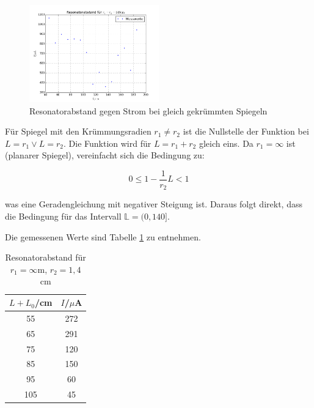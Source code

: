 \begin{figure}
	\centering
	\includegraphics[width=0.5\textwidth]{plots/stabil1}
	\caption{Resonatorabstand gegen Strom bei gleich gekrümmten Spiegeln}
	\label{fig:stabil1}
\end{figure}

\noindent Für Spiegel mit den Krümmungsradien \(r_1\neq r_2\) ist die Nullstelle der Funktion bei \(L=r_1\lor L=r_2\). Die Funktion wird für \(L=r_1+r_2\) gleich eins. Da \(r_1=\infty\) ist (planarer Spiegel), vereinfacht sich die Bedingung zu:

\begin{equation}
0\le1-\frac{1}{r_2}L<1
\end{equation}

\noindent was eine Geradengleichung mit negativer Steigung ist. Daraus folgt direkt, dass die Bedingung für das Intervall \(\mathbb{L}=(0,140]\).

\noindent Die gemessenen Werte sind Tabelle \ref{tab:t2} zu entnehmen.

\begin{table}[H]
	\begin{center}
		\begin{tabular}{c c}
			\toprule
			\(L+L_0\)/cm & \(I\)/\(\mu\)A \\
			\midrule
			55              &272          \\                                                                           
			65              &291        \\                                                                             
			75              &120      \\                                                                               
			85              &150    \\                                                                                 
			95              &60    \\                                                                                  
			105             &45 \\
			\bottomrule
		\end{tabular}
		\caption{Resonatorabstand für \(r_1=\infty\text{m}\), \(r_2=1,4\)cm}
		\label{tab:t2}
	\end{center}
\end{table}

